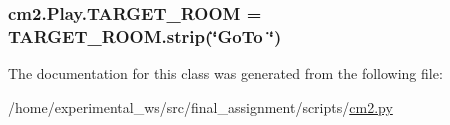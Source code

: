 \subsubsection[{\texorpdfstring{T\+A\+R\+G\+E\+T\+\_\+\+R\+O\+OM}{TARGET_ROOM}}]{\setlength{\rightskip}{0pt plus 5cm}cm2.\+Play.\+T\+A\+R\+G\+E\+T\+\_\+\+R\+O\+OM = T\+A\+R\+G\+E\+T\+\_\+\+R\+O\+O\+M.\+strip(\char`\"{}Go\+To \char`\"{})\hspace{0.3cm}{\ttfamily [static]}}\hypertarget{classcm2_1_1Play_a04801b2166d02c4d58ad8a12ec71dafd}{}\label{classcm2_1_1Play_a04801b2166d02c4d58ad8a12ec71dafd}


The documentation for this class was generated from the following file\+:\begin{DoxyCompactItemize}
\item 
/home/experimental\+\_\+ws/src/final\+\_\+assignment/scripts/\hyperlink{cm2_8py}{cm2.\+py}\end{DoxyCompactItemize}
